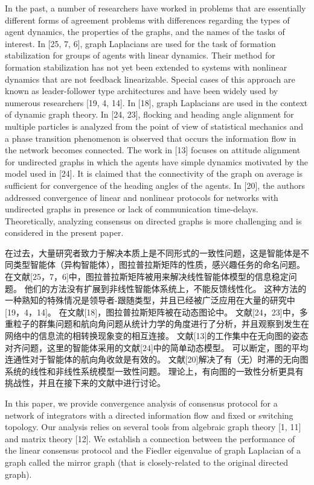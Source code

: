 \documentclass{article}
\begin{document}
{\color[gray]{0.5}
In the past, a number of researchers have worked in problems that are essentially diﬀerent forms of agreement problems with diﬀerences regarding the types of agent dynamics, the properties of the graphs, and {\color{green}the names of the tasks of interest}. 
In [25, 7, 6], graph Laplacians are used for the task of formation stabilization for groups of agents with linear dynamics. 
Their method for formation stabilization has not yet been extended to systems with nonlinear dynamics that are not feedback linearizable. 
Special cases of this approach are known as leader-follower type architectures and have been widely used by numerous researchers [19, 4, 14]. 
In [18], graph Laplacians are used in the context of dynamic graph theory. 
In [24, 23], {\color{green}ﬂocking and heading angle} alignment for multiple particles is analyzed from the point of view of statistical mechanics and a phase transition phenomenon is observed that occurs the information ﬂow in the network becomes connected. 
The work in [13] focuses on attitude alignment for undirected graphs in which the agents have simple dynamics motivated by the model used in [24]. 
It is claimed that the connectivity of the graph on average is suﬃcient for convergence of the heading angles of the agents. 
In [20], the authors addressed convergence of linear and nonlinear protocols for networks with undirected graphs in presence or lack of communication time-delays. 
Theoretically, analyzing consensus on directed graphs is more challenging and is considered in the present paper.
}

在过去，大量研究者致力于解决本质上是不同形式的一致性问题，这是智能体是不同类型智能体（异构智能体），图拉普拉斯矩阵的性质，感兴趣任务的命名问题。
在文献[25，7，6]中，图拉普拉斯矩阵被用来解决线性智能体模型的信息稳定问题。
他们的方法没有扩展到非线性智能体系统上，不能反馈线性化。
这种方法的一种熟知的特殊情况是领导者-跟随类型，并且已经被广泛应用在大量的研究中[19，4，14]。
在文献[18]，图拉普拉斯矩阵被在动态图论中。
文献[24，23]中，多重粒子的群集问题和航向角问题从统计力学的角度进行了分析，并且观察到发生在网络中的信息流的相转换现象变的相互连接。
文献[13]的工作集中在无向图的姿态对齐问题，这里的智能体采用的文献[24]中的简单动态模型。
可以断定，图的平均连通性对于智能体的航向角收敛是有效的。
文献[20]解决了有（无）时滞的无向图系统的线性和非线性系统模型一致性问题。
理论上，有向图的一致性分析更具有挑战性，并且在接下来的文献中进行讨论。

{\color[gray]{0.5}
In this paper, we provide convergence analysis of consensus protocol for a network of {\color{green}integrators} with a directed information ﬂow and ﬁxed or switching topology. 
Our analysis relies on several tools from algebraic graph theory [1, 11] and matrix theory [12]. 
We establish a connection between the performance of the linear consensus protocol and the Fiedler eigenvalue of graph Laplacian of a graph called the mirror graph (that is closely-related to the original directed graph).
}
\end{document}
